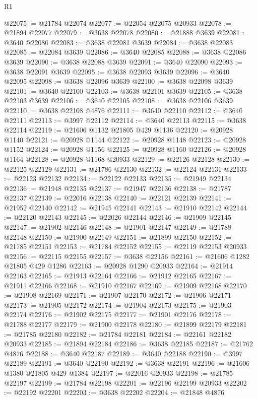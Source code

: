 \begin{lexlean}{R1}
\begin{coremodule}
@22075 := @21784 @22074
@22077 := @22054 @22075 @20933
@22078 := @21894 @22077
@22079 := @3638 @22078
@22080 := @21888 @3639
@22081 := @3640 @22080
@22083 := @3638 @22081 @3639
@22084 := @3638 @22083
@22085 := @22084 @3639
@22086 := @3640 @22085
@22088 := @3638 @22086 @3639
@22090 := @3638 @22088 @3639
@22091 := @3640 @22090
@22093 := @3638 @22091 @3639
@22095 := @3638 @22093 @3639
@22096 := @3640 @22095
@22098 := @3638 @22096 @3639
@22100 := @3638 @22098 @3639
@22101 := @3640 @22100
@22103 := @3638 @22101 @3639
@22105 := @3638 @22103 @3639
@22106 := @3640 @22105
@22108 := @3638 @22106 @3639
@22110 := @3638 @22108 @4876
@22111 := @3640 @22110
@22112 := @3640 @22111
@22113 := @3997 @22112
@22114 := @3640 @22113
@22115 := @3638 @22114
@22119 := @21606 @1132 @21805 @429 @1136
@22120 := @20928 @1140
@22121 := @20928 @1144
@22122 := @20928 @1148
@22123 := @20928 @1152
@22124 := @20928 @1156
@22125 := @20928 @1160
@22126 := @20928 @1164
@22128 := @20928 @1168 @20933
@22129 := @22126 @22128
@22130 := @22125 @22129
@22131 := @21786 @22130
@22132 := @22124 @22131
@22133 := @22123 @22132
@22134 := @22122 @22133
@22135 := @21949 @22134
@22136 := @21948 @22135
@22137 := @21947 @22136
@22138 := @21787 @22137
@22139 := @22016 @22138
@22140 := @22121 @22139
@22141 := @21952 @22140
@22142 := @21945 @22141
@22143 := @21910 @22142
@22144 := @22120 @22143
@22145 := @22026 @22144
@22146 := @21909 @22145
@22147 := @21902 @22146
@22148 := @21901 @22147
@22149 := @21788 @22148
@22150 := @21900 @22149
@22151 := @21899 @22150
@22152 := @21785 @22151
@22153 := @21784 @22152
@22155 := @22119 @22153 @20933
@22156 := @22115 @22155
@22157 := @3638 @22156
@22161 := @21606 @1282 @21805 @429 @1286
@22163 := @20928 @1290 @20933
@22164 := @21914 @22163
@22165 := @21913 @22164
@22166 := @21912 @22165
@22167 := @21911 @22166
@22168 := @21910 @22167
@22169 := @21909 @22168
@22170 := @21908 @22169
@22171 := @21907 @22170
@22172 := @21906 @22171
@22173 := @21905 @22172
@22174 := @21904 @22173
@22175 := @21903 @22174
@22176 := @21902 @22175
@22177 := @21901 @22176
@22178 := @21788 @22177
@22179 := @21900 @22178
@22180 := @21899 @22179
@22181 := @21785 @22180
@22182 := @21784 @22181
@22184 := @22161 @22182 @20933
@22185 := @21894 @22184
@22186 := @3638 @22185
@22187 := @21762 @4876
@22188 := @3640 @22187
@22189 := @3640 @22188
@22190 := @3997 @22189
@22191 := @3640 @22190
@22192 := @3638 @22191
@22196 := @21606 @1380 @21805 @429 @1384
@22197 := @22016 @20933
@22198 := @21785 @22197
@22199 := @21784 @22198
@22201 := @22196 @22199 @20933
@22202 := @22192 @22201
@22203 := @3638 @22202
@22204 := @21848 @4876

\end{coremodule}
\end{lexlean}
